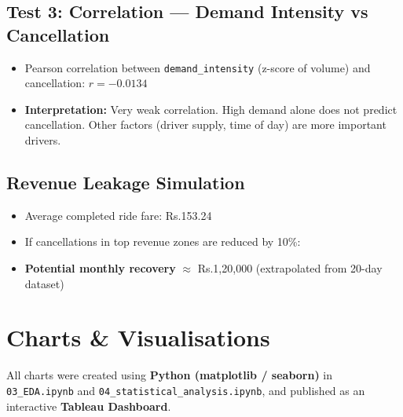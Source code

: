 \documentclass[12pt,a4paper]{article}
\begin{document}
\subsection{Test 3: Correlation --- Demand Intensity vs Cancellation}
\begin{itemize}
  \item Pearson correlation between \texttt{demand\_intensity} (z-score of volume) and cancellation: $r = -0.0134$
  \item \textbf{Interpretation:} Very weak correlation. High demand alone does not predict cancellation. Other factors (driver supply, time of day) are more important drivers.
\end{itemize}

\subsection{Revenue Leakage Simulation}
\begin{itemize}
  \item Average completed ride fare: Rs.153.24
  \item If cancellations in top revenue zones are reduced by 10\%:
  \item \textbf{Potential monthly recovery} $\approx$ Rs.1,20,000 (extrapolated from 20-day dataset)
\end{itemize}

\section{Charts \& Visualisations}

All charts were created using \textbf{Python (matplotlib / seaborn)} in \texttt{03\_EDA.ipynb} and \texttt{04\_statistical\_analysis.ipynb}, and published as an interactive \textbf{Tableau Dashboard}.
\end{document}

